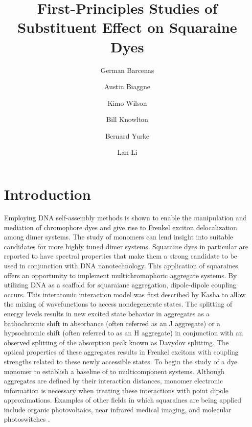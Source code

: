 \documentclass[journal=jacsat,manuscript=article]{achemso}
\title{
First-Principles Studies of Substituent Effect on Squaraine Dyes\\
}
\author{German Barcenas}
\affiliation{Boise State University}
\author{Austin Biaggne}
\affiliation{Boise State University}
\author{Kimo Wilson}
\affiliation{Boise State University}
\author{Bill Knowlton}
\affiliation{Boise State University}
\author{Bernard Yurke}
\affiliation{Boise State University}
\author{Lan Li}
\affiliation{Boise State University}
\begin{document}
\maketitle

\section{Introduction}
Employing DNA self-assembly methods is shown to enable the manipulation and mediation of chromophore dyes and give rise to Frenkel exciton delocalization among dimer systems\cite{Cannon2018LargeAggregates}. The study of monomers can lend insight into suitable candidates for more highly tuned dimer systems. Squaraine dyes in particular are reported to have spectral properties that make them a strong candidate to be used in conjunction with DNA nanotechnology\cite{Markova2013ComparisonLabels}⁠. This application of squaraines offers an opportunity to implement multichromophoric aggregate systems. 
By utilizing DNA as a scaffold for squaraiane aggregation, dipole-dipole coupling occurs\cite{Cannon2017CoherentSystem}. This interatomic interaction model was first described by Kasha to allow the mixing of wavefunctions to access nondegenerate states\cite{Kasha1965TheSpectroscopy}. The splitting of energy levels results in new excited state behavior in aggregates as a bathochromic shift in absorbance (often referred as an J aggregate) or a hypsochromic shift (often referred to as an H aggregate)\cite{Wurthner2011J-aggregates:Materials} in conjunction with an observed splitting of the absorption peak known as Davydov splitting\cite{Zhong2019DavydovDimers}. The optical properties of these aggregates results in Frenkel excitons with coupling strengths related to these newly accessible states. 
To begin the study of a dye monomer to establish a baseline of to multicomponent systems. Although aggregates are defined by their interaction distances, monomer electronic information is necessary when treating these interactions with point dipole approximations\cite{Abramavicius2009ExtractingSpectra}. Examples of other fields in which squaraines are being applied include organic photovoltaics\citep{Wei2012FunctionalizedPhotovoltaics, Chen2018DensityCell}, near infrared medical imaging\cite{Strassel2018SquaraineNm}⁠, and molecular photoswitches\citep{Kellis2019AnPhases, Scholes2011LessonsHarvesting} .
\end{document}
